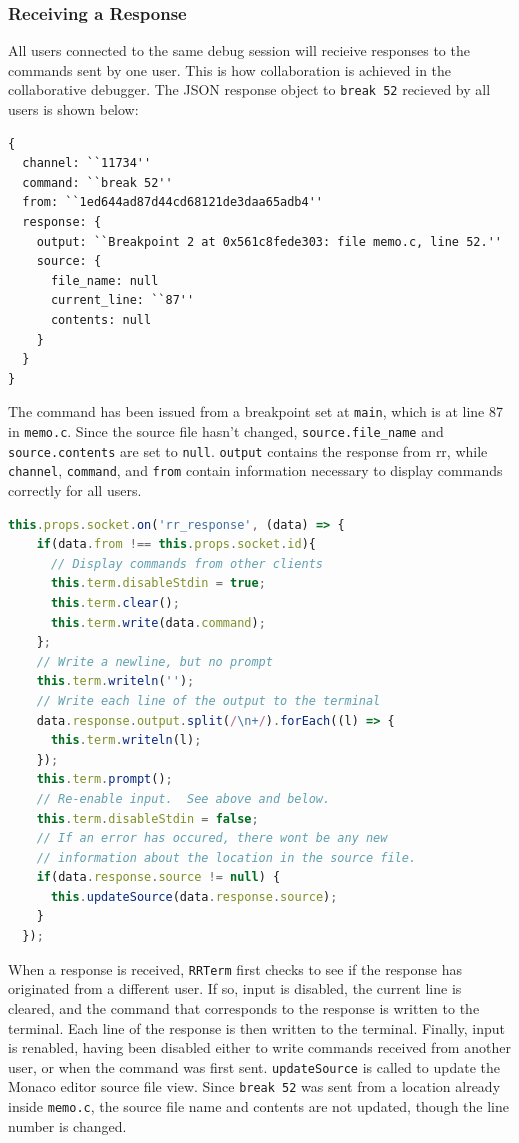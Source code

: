 \documentclass[12pt]{article}
\begin{document}
\subsubsection{Receiving a Response}

All users connected to the same debug session will recieive responses
to the commands sent by one user.  This is how collaboration is
achieved in the collaborative debugger.  The JSON response object to
\lstinline{break 52} recieved by all users is shown below:

\begin{lstlisting}[basicstyle=\linespread{0.5}\ttfamily,caption={JSON Response},captionpos=b]
{
  channel: ``11734''
  command: ``break 52''
  from: ``1ed644ad87d44cd68121de3daa65adb4''
  response: {
    output: ``Breakpoint 2 at 0x561c8fede303: file memo.c, line 52.''
    source: {
      file_name: null
      current_line: ``87''
      contents: null
    }
  }
}
\end{lstlisting}

The command has been issued from a breakpoint set at \lstinline{main},
which is at line 87 in \lstinline{memo.c}.  Since the source file
hasn't changed, \lstinline{source.file_name} and
\lstinline{source.contents} are set to \lstinline{null}.
\lstinline{output} contains the response from rr, while
\lstinline{channel}, \lstinline{command}, and \lstinline{from} contain
information necessary to display commands correctly for all users.

\begin{lstlisting}[language=Javascript,basicstyle=\linespread{0.5}\ttfamily,caption={Processing a Response},captionpos=b]
  this.props.socket.on('rr_response', (data) => {
    if(data.from !== this.props.socket.id){
      // Display commands from other clients
      this.term.disableStdin = true;
      this.term.clear();
      this.term.write(data.command);
    };
    // Write a newline, but no prompt
    this.term.writeln('');
    // Write each line of the output to the terminal
    data.response.output.split(/\n+/).forEach((l) => {
      this.term.writeln(l);
    });
    this.term.prompt();
    // Re-enable input.  See above and below.
    this.term.disableStdin = false;
    // If an error has occured, there wont be any new
    // information about the location in the source file.
    if(data.response.source != null) {
      this.updateSource(data.response.source);
    }
  });
\end{lstlisting}

When a response is received, \lstinline{RRTerm} first checks to see if
the response has originated from a different user.  If so, input is
disabled, the current line is cleared, and the command that
corresponds to the response is written to the terminal.  Each line of
the response is then written to the terminal.  Finally, input is
renabled, having been disabled either to write commands received from
another user, or when the command was first sent.
\lstinline{updateSource} is called to update the Monaco editor source
file view.  Since \lstinline{break 52} was sent from a location
already inside \lstinline{memo.c}, the source file name and contents
are not updated, though the line number is changed.
\end{document}
